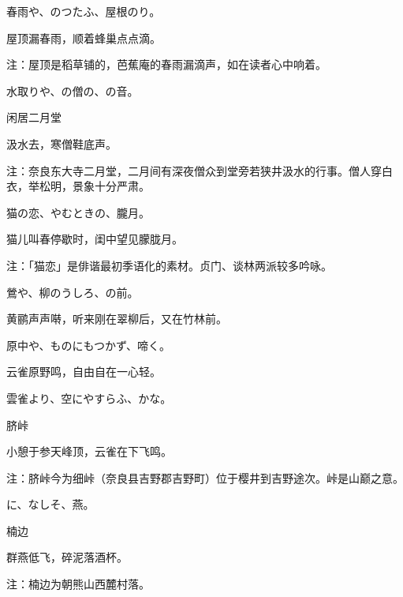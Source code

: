 \begin{haiku}
    {\FH 春雨や、のつたふ、屋根のり。}

    {\FK 屋顶漏春雨，顺着蜂巢点点滴。}

    {\FT 注：屋顶是稻草铺的，芭蕉庵的春雨漏滴声，如在读者心中响着。}
\end{haiku}

\begin{haiku}
    {\FH 水取りや、の僧の、の音。}

    {\FK 闲居二月堂}

    {\FK 汲水去，寒僧鞋底声。}

    {\FT 注：奈良东大寺二月堂，二月间有深夜僧众到堂旁若狭井汲水的行事。僧人穿白衣，举松明，景象十分严肃。}
\end{haiku}

\begin{haiku}
    {\FH 猫の恋、やむときの、朧月。}

    {\FK 猫儿叫春停歇时，闺中望见朦胧月。}

    {\FT 注：「猫恋」是俳谐最初季语化的素材。贞门、谈林两派较多吟咏。}
\end{haiku}

\begin{haiku}
    {\FH 鶯や、柳のうしろ、の前。}

    {\FK 黄鹂声声啭，听来刚在翠柳后，又在竹林前。}
\end{haiku}

\begin{haiku}
    {\FH 原中や、ものにもつかず、啼く。}

    {\FK 云雀原野鸣，自由自在一心轻。}
\end{haiku}

\begin{haiku}
    {\FH 雲雀より、空にやすらふ、かな。}

    {\FK 脐峠}

    {\FK 小憩于参天峰顶，云雀在下飞鸣。}

    {\FT 注：脐峠今为细峠（奈良县吉野郡吉野町）位于樱井到吉野途次。峠是山巅之意。}
\end{haiku}

\begin{haiku}
    {\FH {}に、なしそ、燕。}

    {\FK 楠边}

    {\FK 群燕低飞，碎泥落酒杯。}

    {\FT 注：楠边为朝熊山西麓村落。}
\end{haiku}

